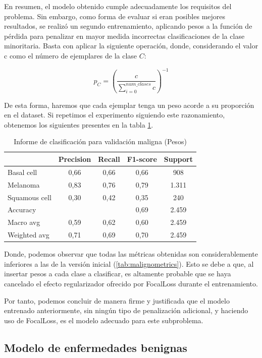 En resumen, el modelo obtenido cumple adecuadamente los requisitos del problema. Sin embargo, como forma de evaluar si eran posibles mejores resultados, se realizó un segundo entrenamiento, aplicando pesos a la función de pérdida para penalizar en mayor medida incorrectas clasificaciones de la clase minoritaria. Basta con aplicar la siguiente operación, donde, considerando el valor c como el número de ejemplares de la clase $C$:

$$p_C =(\frac{c}{\sum_{i=0}^{num\_clases} c} )^{-1}$$

De esta forma, haremos que cada ejemplar tenga un peso acorde a su proporción en el dataset. Si repetimos el experimento siguiendo este razonamiento, obtenemos los siguientes presentes en la tabla \ref{tab:malignometrics2}.

\begin{table}[!ht]
	\centering
	\begin{tabular}{|l|c|c|c|c|}
		\hline
		& Precision & Recall & F1-score & Support \\
		\hline
		Basal cell & 0,66 & 0,66 & 0,66 & 908 \\
		Melanoma & 0,83 & 0,76 & 0,79 & 1.311 \\
		Squamous cell & 0,30 & 0,42 & 0,35 & 240 \\
		\hline
		Accuracy &  &  & 0,69 & 2.459 \\
		Macro avg & 0,59& 0,62& 0,60&2.459\\
		Weighted avg&0,71&0,69&0,70&2.459\\
		\hline
	\end{tabular}
	\caption{Informe de clasificación para validación maligna (Pesos)}
	\label{tab:malignometrics2}
\end{table}


Donde, podemos observar que todas las métricas obtenidas son considerablemente inferiores a las de la versión inicial (\ref{tab:malignometrics}). Esto se debe a que, al insertar pesos a cada clase a clasificar, es altamente probable que se haya cancelado el efecto regularizador ofrecido por FocalLoss durante el entrenamiento.

Por tanto, podemos concluir de manera firme y justificada que el modelo entrenado anteriormente, sin ningún tipo de penalización adicional, y haciendo uso de FocalLoss, es el modelo adecuado para este subproblema.

\subsection{Modelo de enfermedades benignas}
\label{sec:benigncapt5}

